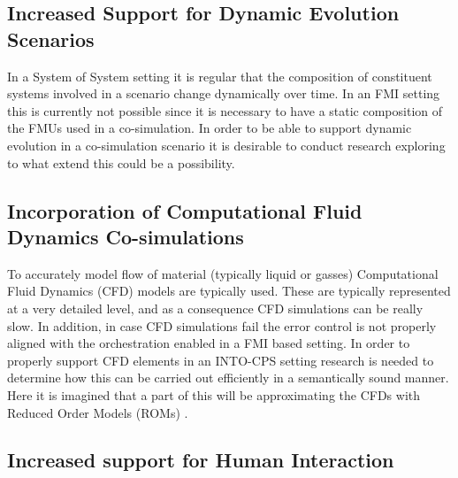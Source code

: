 
\subsection{Increased Support for Dynamic Evolution Scenarios}

In a System of System setting it is regular that the composition of constituent systems involved in a scenario change dynamically over time. In an FMI setting this is currently not possible since it is necessary to have a static composition of the FMUs used in a co-simulation. In order to be able to support dynamic evolution in a co-simulation scenario it is desirable to conduct research exploring to what extend this could be a possibility.


\subsection{Incorporation of Computational Fluid Dynamics Co-simulations}

To accurately model flow of material (typically liquid or gasses) Computational Fluid Dynamics (CFD) models are typically used. These are typically represented at a very detailed level, and as a consequence CFD simulations can be really slow. In addition, in case CFD simulations fail the error control is not properly aligned with the orchestration enabled in a FMI based setting. In order to properly support CFD elements in an INTO-CPS setting research is needed to determine how this can be carried out efficiently in a semantically sound manner. Here it is imagined that a part of this will be approximating the CFDs with Reduced Order Models (ROMs) \cite{Carlberg&13}.


\subsection{Increased support for Human Interaction}


